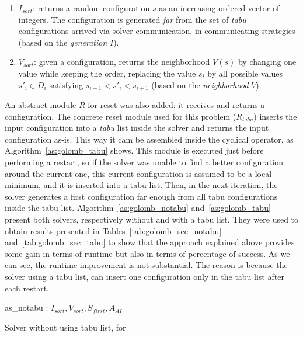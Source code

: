 \begin{enumerate}
	\item$I_{sort}$: returns a random configuration $s$ as an increasing ordered vector of integers. The configuration is generated \textit{far} from the set of {\it tabu} configurations arrived via solver-communication, in communicating strategies (based on the \textit{generation} \absm{} $I$).
	\item $V_{sort}$: given a configuration, returns the neighborhood $V\left(s\right)$ by changing one value while keeping the order, \ie replacing the value $s_i$ by all possible values $s'_i \in D_i$ satisfying $s_{i-1} < s'_i < s_{i+1}$ (based on the \textit{neighborhood} \absm{} $V$).
\end{enumerate}

An abstract module $R$ for reset was also added: it receives and returns a configuration. The concrete reset module used for this problem ($R_{tabu}$) inserts the input configuration into a \textit{tabu} list inside the solver and returns the input configuration as-is. This way it cam be assembled inside the cyclical operator, as Algorithm~\ref{as:golomb_tabu} shows. This module is executed just before performing a restart, so if the solver was unable to find a better configuration around the current one, this current configuration is assumed to be a local minimum, and it is inserted into a tabu list. Then, in the next iteration, the solver generates a first configuration far enough from all tabu configurations inside the tabu list. Algorithm~\ref{as:golomb_notabu} and~\ref{as:golomb_tabu} present both solvers, respectively without and with a tabu list. They were used to obtain results presented in Tables~\ref{tab:golomb_sec_notabu} and~\ref{tab:golomb_sec_tabu} to show that the approach explained above provides some gain in terms of runtime but also in terms of percentage of success. As we can see, the runtime improvement is not substantial. The reason is because the solver using a tabu list, can insert one configuration only in the tabu list after each restart.

\begin{algorithm}[H]
\dontprintsemicolon
\SetNoline
{}
   as\_notabu\;
\algoindent {} : $I_{sort}, V_{sort}, S_{first}, A_{AI}$ \;
\caption{Solver without using tabu list, for \GRP}\label{as:golomb_notabu}
\end{algorithm}

